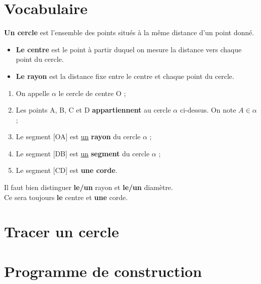 \documentclass[11pt]{article}
\begin{document}
\section{Vocabulaire}

\begin{definition}
  \textbf{Un cercle} est l'ensemble des points situés à la même distance d'un
  point donné.
\end{definition}

\begin{vocabulaire}
  \begin{itemize}
  \item \textbf{Le centre} est le point à partir duquel on mesure la
    distance vers chaque point du cercle.
  \item \textbf{Le rayon} est la distance fixe entre le centre et chaque point
    du cercle.
  \end{itemize}
\end{vocabulaire}

\begin{exemple}
  \begin{center}
    
  \end{center}
\end{exemple}

\begin{vocabulaire}
  \begin{enumerate}
  \item On appelle $\alpha$ le cercle de centre O ; 
  \item Les points A, B, C et D \textbf{appartiennent} au cercle
    $\alpha$ ci-dessus. On note $A \in \alpha$ ;
  \item Le segment [OA] est \underline{un} \textbf{rayon} du cercle
    $\alpha$ ;
  \item Le segment [DB] est \underline{un} \textbf{segment} du cercle
    $\alpha$ ;
  \item Le segment [CD] est \textbf{une corde}.
  \end{enumerate}
\end{vocabulaire}

\begin{remarque}
Il faut bien distinguer \textbf{le/un} rayon et \textbf{le/un}
diamètre. \\
Ce sera toujours \textbf{le} centre et \textbf{une} corde.            
\end{remarque}

\newpage


\section{Tracer un cercle}

\section{Programme de construction}
\end{document}
